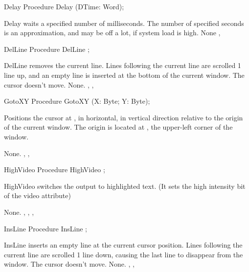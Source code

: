 \begin{procedure}{Delay}
\Declaration
Procedure Delay (DTime: Word);

\Description
Delay waits a specified number of milliseconds. The number of specified
seconds is an approximation, and may be off a lot, if system load is high.
\Errors
None
\SeeAlso
{}, 
\end{procedure}
 \html{}
\begin{procedure}{DelLine}
\Declaration
Procedure DelLine ;

\Description
 DelLine removes the current line. Lines following the current line are 
scrolled 1 line up, and an empty line is inserted at the bottom of the
current window. The cursor doesn't move.
\Errors
None.
\SeeAlso
{}, , 
\end{procedure}
 \html{}
\begin{procedure}{GotoXY}
\Declaration
Procedure GotoXY (X: Byte; Y: Byte);

\Description
 Positions the cursor at ,  in horizontal,  in
vertical direction relative to the origin of the current window. The origin
is located at , the upper-left corner of the window.

\Errors
None.
\SeeAlso
 , ,  
\end{procedure}
 \html{}
\begin{procedure}{HighVideo}
\Declaration
Procedure HighVideo ;

\Description
 HighVideo switches the output to highlighted text. (It sets the high
intensity bit of the video attribute)

\Errors
None.
\SeeAlso
 , , ,
\end{procedure}
 \html{}
\begin{procedure}{InsLine}
\Declaration
Procedure InsLine ;

\Description
 InsLine inserts an empty line at the current cursor position. 
Lines following the current line are scrolled 1 line down, 
causing the last line to disappear from the window. 
The cursor doesn't move.
\Errors
None.
\SeeAlso
{}, , 
\end{procedure}
